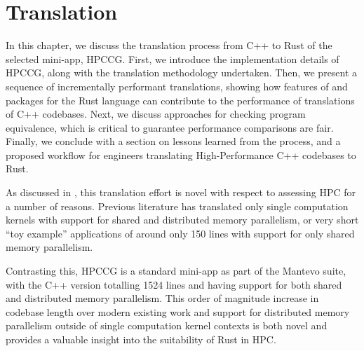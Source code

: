 \chapter{Translation}
\label{ch:translation}


In this chapter, we discuss the translation process from C++ to Rust of the selected \acrshort{mini-app}, HPCCG. First, we introduce the implementation details of HPCCG, along with the translation methodology undertaken. Then, we present a sequence of incrementally performant translations, showing how features of and packages for the Rust language can contribute to the performance of translations of C++ codebases. Next, we discuss approaches for checking program equivalence, which is critical to guarantee performance comparisons are fair. Finally, we conclude with a section on lessons learned from the process, and a proposed workflow for engineers translating High-Performance C++ codebases to Rust.


As discussed in , this translation effort is novel with respect to assessing \acrshort{HPC} for a number of reasons. Previous literature has translated only single computation kernels \cite{bychkovRustLanguageSupercomputing2021} with support for shared and distributed memory parallelism, or very short ``toy example'' applications of around only 150 lines \cite{costanzoPerformanceVsProgramming2021} \cite{moranEmergingTechnologiesRust2023} with support for only shared memory parallelism.

Contrasting this, HPCCG is a standard \acrshort{mini-app} as part of the Mantevo suite, with the C++ version totalling 1524 lines and having support for both shared and distributed memory parallelism. This order of magnitude increase in codebase length over modern existing work and support for distributed memory parallelism outside of single computation kernel contexts is both novel and provides a valuable insight into the suitability of Rust in \acrshort{HPC}.


